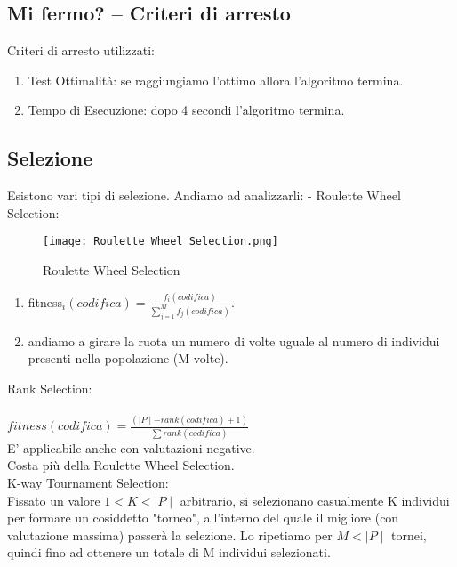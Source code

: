 \documentclass[10pt,a4paper]{article}
\begin{document}
      \newpage
      
  
    \subsection{Mi fermo? -- Criteri di arresto}
    \label{MiFermo?--CriteriDiArrestoSubsection}
    Criteri di arresto utilizzati:
    \begin{enumerate}
      \item Test Ottimalità: se raggiungiamo l’ottimo allora l'algoritmo termina.
      \item Tempo di Esecuzione: dopo 4 secondi l’algoritmo termina.
    \end{enumerate}
    
  
    \subsection{Selezione}
    \label{Selezione}
    Esistono vari tipi di selezione. Andiamo ad analizzarli:
    - Roulette Wheel Selection:
    \begin{figure}[h!]
      \centering
      \caption{Roulette Wheel Selection}
      \texttt{[image: Roulette Wheel Selection.png]}
      \label{RouletteWheelSelection}
    \end{figure}
    \begin{enumerate}
      \item fitness$_{i}(codifica) =\frac{f_{i}(codifica)}{\sum\limits_{j = 1}^{M} {f_{j} (codifica)}}$.
      \item andiamo a girare la ruota un numero di volte uguale al numero di individui presenti nella 
            popolazione (M volte).
    \end{enumerate} 
    
    \newpage
    
    Rank Selection:\\\\
    $ fitness(codifica) = \frac {(\mid P \mid - rank(codifica) + 1)} {\sum{rank(codifica)}}$\\
    E’ applicabile anche con valutazioni negative.\\
    Costa più della Roulette Wheel Selection.\\
    
    K-way Tournament Selection:\\
    Fissato un valore $1 < K < \mid P \mid$ arbitrario, si selezionano casualmente K individui per formare un 
    cosiddetto "torneo", all’interno del quale il migliore (con valutazione massima) passerà la 
    selezione. Lo ripetiamo per $M < \mid P \mid$ tornei, quindi fino ad ottenere un totale di M individui 
    selezionati.\\\\
    
\end{document}
